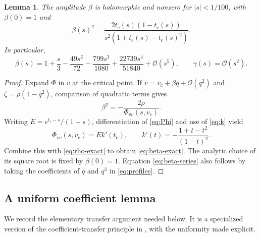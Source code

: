 \documentclass[11pt,a4paper]{article}
\newtheorem{lemma}[theorem]{Lemma}
\theoremstyle{definition}
\theoremstyle{remark}
\newcommand{\OO}{\mathcal O}
\newcommand{\tc}{t_{\mathrm c}}
\newcommand{\vc}{v_{\mathrm c}}
\begin{document}
\begin{lemma}\label{lem:beta}
The amplitude $\beta$ is holomorphic and nonzero for $|s|<1/100$,
with $\beta(0)=1$ and
\begin{equation}\label{eq:beta-exact}
 \beta(s)^2=
 \frac{2\tc(s)(1-\tc(s))}{s^2(1+\tc(s)-\tc(s)^2)}.
\end{equation}
In particular,
\begin{equation}\label{eq:beta-series}
 \beta(s)=1+\frac s3-\frac{49s^2}{72}-\frac{799s^3}{1080}
                         +\frac{22739s^4}{51840}+\OO(s^5),
 \qquad \gamma(s)=\OO(s^2).
\end{equation}
\end{lemma}
\begin{proof}
Expand $\Phi$ in $v$ at the critical point. If
$v=\vc+\beta q+\OO(q^2)$ and
$\zeta=\rho(1-q^2)$, comparison of quadratic terms gives
\[
 \beta^2=-\frac{2\rho}{\Phi_{vv}(s,\vc)}.
\]
Writing $E=e^{\tc-s}/(1-s)$, differentiation of \eqref{eq:Phi} and use of
\eqref{eq:k} yield
\[
 \Phi_{vv}(s,\vc)=E k'(\tc),\qquad
 k'(t)=-\frac{1+t-t^2}{(1-t)^2}.
\]
Combine this with \eqref{eq:rho-exact} to obtain
\eqref{eq:beta-exact}. The analytic choice of its square root is fixed
by $\beta(0)=1$. Equation \eqref{eq:beta-series} also follows by taking
the coefficients of $q$ and $q^3$ in \eqref{eq:profiles}.
\end{proof}

\subsection{A uniform coefficient lemma}
We record the elementary transfer argument needed below. It is a
specialized version of the coefficient-transfer principle in
\cite{flajolet-odlyzko}, with the uniformity made explicit.
\end{document}
